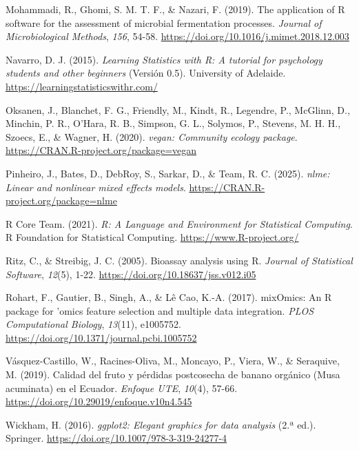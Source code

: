 \documentclass[
  spanish,
  letterpaper,
  DIV=11,
  numbers=noendperiod]{scrreprt}
\newlength{\cslhangindent}
\newenvironment{CSLReferences}[2] %
 {\begin{list}{}{%
  \setlength{\itemindent}{0pt}
  \setlength{\leftmargin}{0pt}
  \setlength{\parsep}{0pt}
  \ifodd #1
   \setlength{\leftmargin}{\cslhangindent}
   \setlength{\itemindent}{-1\cslhangindent}
  \fi
  \setlength{\itemsep}{#2\baselineskip}}}
 {\end{list}}
\begin{document}
\begin{CSLReferences}{1}{0}
Mohammadi, R., Ghomi, S. M. T. F., \& Nazari, F. (2019). {The
application of R software for the assessment of microbial fermentation
processes}. \emph{Journal of Microbiological Methods}, \emph{156},
54-58. \url{https://doi.org/10.1016/j.mimet.2018.12.003}

Navarro, D. J. (2015). \emph{{Learning Statistics with R: A tutorial for
psychology students and other beginners}} (Versión 0.5). University of
Adelaide. \url{https://learningstatisticswithr.com/}

Oksanen, J., Blanchet, F. G., Friendly, M., Kindt, R., Legendre, P.,
McGlinn, D., Minchin, P. R., O'Hara, R. B., Simpson, G. L., Solymos, P.,
Stevens, M. H. H., Szoecs, E., \& Wagner, H. (2020). \emph{{vegan:
Community ecology package}}.
\url{https://CRAN.R-project.org/package=vegan}

Pinheiro, J., Bates, D., DebRoy, S., Sarkar, D., \& Team, R. C. (2025).
\emph{{nlme: Linear and nonlinear mixed effects models}}.
\url{https://CRAN.R-project.org/package=nlme}

R Core Team. (2021). \emph{R: A Language and Environment for Statistical
Computing}. R Foundation for Statistical Computing.
\url{https://www.R-project.org/}

Ritz, C., \& Streibig, J. C. (2005). {Bioassay analysis using R}.
\emph{Journal of Statistical Software}, \emph{12}(5), 1-22.
\url{https://doi.org/10.18637/jss.v012.i05}

Rohart, F., Gautier, B., Singh, A., \& Lê Cao, K.-A. (2017). {mixOmics:
An R package for 'omics feature selection and multiple data
integration}. \emph{PLOS Computational Biology}, \emph{13}(11),
e1005752. \url{https://doi.org/10.1371/journal.pcbi.1005752}

Vásquez-Castillo, W., Racines-Oliva, M., Moncayo, P., Viera, W., \&
Seraquive, M. (2019). Calidad del fruto y p{é}rdidas postcosecha de
banano org{á}nico ({Musa acuminata}) en el {Ecuador}. \emph{Enfoque
UTE}, \emph{10}(4), 57-66.
\url{https://doi.org/10.29019/enfoque.v10n4.545}

Wickham, H. (2016). \emph{{ggplot2: Elegant graphics for data analysis}}
(2.ª ed.). Springer. \url{https://doi.org/10.1007/978-3-319-24277-4}


\end{CSLReferences}
\end{document}
